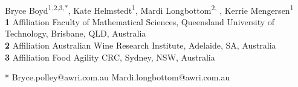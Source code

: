 \documentclass[10pt,letterpaper]{article}
\begin{document}
\vspace*{0.2in}

\begin{flushleft}
{\Large
\textbf{}
}
\newline
\\
Bryce Boyd\textsuperscript{1,2,3,*},
Kate Helmstedt\textsuperscript{1},
Mardi Longbottom\textsuperscript{2, \dag},
Kerrie Mengersen\textsuperscript{1}
\\
\bigskip
\textbf{1} Affiliation Faculty of Mathematical Sciences, Queensland University of Technology, Brisbane, QLD, Australia
\\
\textbf{2} Affiliation Australian Wine Research Institute, Adelaide, SA, Australia
\\
\textbf{3} Affiliation Food Agility CRC, Sydney, NSW, Australia
\\
\bigskip

% 
%







* Bryce.polley@awri.com.au
\dag Mardi.longbottom@awri.com.au

\end{flushleft}
\end{document}
